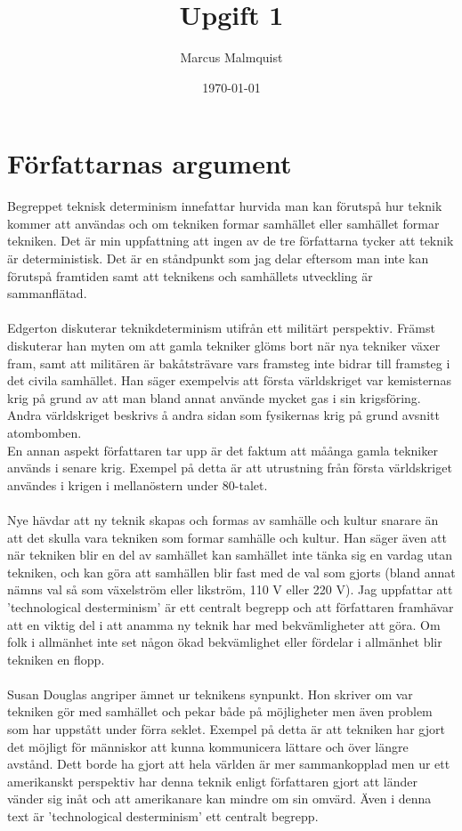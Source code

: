 \documentclass[12pt,a4paper]{IEEEtran}
\title{Upgift 1}
\author{Marcus Malmquist}
\date{\today}
\begin{document}
\maketitle

\section*{Författarnas argument}
Begreppet teknisk determinism innefattar hurvida man kan förutspå hur teknik kommer att användas och om tekniken formar samhället eller samhället formar tekniken. Det är min uppfattning att ingen av de tre författarna tycker att teknik är deterministisk. Det är en ståndpunkt som jag delar eftersom man inte kan förutspå framtiden samt att teknikens och samhällets utveckling är sammanflätad.\\\\

\noindent Edgerton diskuterar teknikdeterminism utifrån ett militärt perspektiv. Främst diskuterar han myten om att gamla tekniker glöms bort när nya tekniker växer fram, samt att militären är bakåtsträvare vars framsteg inte bidrar till framsteg i det civila samhället. Han säger exempelvis att första världskriget var kemisternas krig på grund av att man bland annat använde mycket gas i sin krigsföring. Andra världskriget beskrivs å andra sidan som fysikernas krig på grund avsnitt atombomben.\\
En annan aspekt författaren tar upp är det faktum att måånga gamla tekniker används i senare krig. Exempel på detta är att utrustning från första världskriget användes i krigen i mellanöstern under 80-talet.\\\\

\noindent Nye hävdar att ny teknik skapas och formas av samhälle och kultur snarare än att det skulla vara tekniken som formar samhälle och kultur. Han säger även att när tekniken blir en del av samhället kan samhället inte tänka sig en vardag utan tekniken, och kan göra att samhällen blir fast med de val som gjorts (bland annat nämns val så som växelström eller likström, 110 V eller 220 V).
Jag uppfattar att 'technological desterminism' är ett centralt begrepp och att författaren framhävar att en viktig del i att anamma ny teknik har med bekvämligheter att göra. Om folk i allmänhet inte set någon ökad bekvämlighet eller fördelar i allmänhet blir tekniken en flopp.\\\\
\noindent Susan Douglas angriper ämnet ur teknikens synpunkt. Hon skriver om var tekniken gör med samhället och pekar både på möjligheter men även problem som har uppstått under förra seklet. Exempel på detta är att tekniken har gjort det möjligt för människor att kunna kommunicera lättare och över längre avstånd. Dett borde ha gjort att hela världen är mer sammankopplad men ur ett amerikanskt perspektiv har denna teknik enligt författaren gjort att länder vänder sig inåt och att amerikanare kan mindre om sin omvärd.
Även i denna text är 'technological desterminism' ett centralt begrepp.
\end{document}
